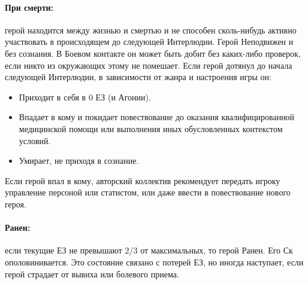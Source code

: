 \paragraph{При смерти:} герой находится между жизнью и смертью и не способен сколь-нибудь активно участвовать в происходящем до следующей Интерлюдии. Герой Неподвижен и без сознания. В Боевом контакте он может быть добит без каких-либо проверок, если никто из окружающих этому не помешает.
\newline Если герой дотянул до начала следующей Интерлюдии, в зависимости от жанра и настроения игры он:
\begin{itemize}
  \item Приходит в себя в 0 ЕЗ (и Агонии).
  \item Впадает в кому и покидает повествование до оказания квалифицированной медицинской помощи или выполнения иных обусловленных контекстом условий.
  \item Умирает, не приходя в сознание.
\end{itemize}
\begin{tcolorbox}
  Если герой впал в кому, авторский коллектив рекомендует передать игроку управление персоной или статистом, или даже ввести в повествование нового героя.
\end{tcolorbox}
\paragraph{Ранен:} если текущие ЕЗ не превышают 2/3 от максимальных, то герой Ранен. Его Ск ополовинивается. 
\newline Это состояние связано с потерей ЕЗ, но иногда наступает, если герой страдает от вывиха или болевого приема.

